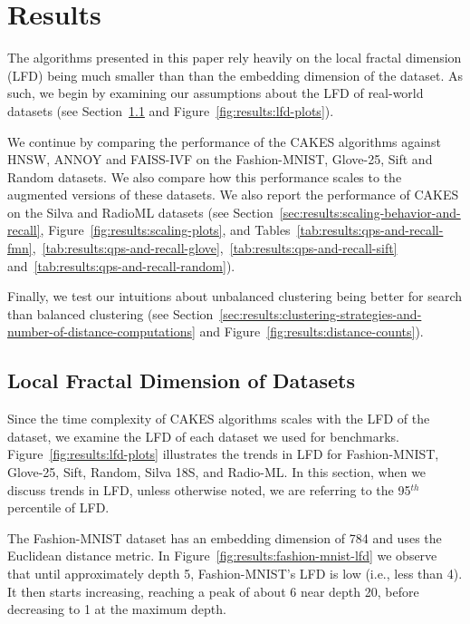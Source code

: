 \section{Results}
\label{sec:results}

The algorithms presented in this paper rely heavily on the local fractal dimension (LFD) being much smaller than than the embedding dimension of the dataset.
As such, we begin by examining our assumptions about the LFD of real-world datasets (see Section~\ref{sec:results:lfd-of-datasets} and Figure~\ref{fig:results:lfd-plots}).

We continue by comparing the performance of the CAKES algorithms against HNSW, ANNOY and FAISS-IVF on the Fashion-MNIST, Glove-25, Sift and Random datasets.
We also compare how this performance scales to the augmented versions of these datasets.
We also report the performance of CAKES on the Silva and RadioML datasets (see Section~\ref{sec:results:scaling-behavior-and-recall}, Figure~\ref{fig:results:scaling-plots}, and Tables~\ref{tab:results:qps-and-recall-fmn},~\ref{tab:results:qps-and-recall-glove},~\ref{tab:results:qps-and-recall-sift} and~\ref{tab:results:qps-and-recall-random}).

Finally, we test our intuitions about unbalanced clustering being better for search
than balanced clustering (see Section~\ref{sec:results:clustering-strategies-and-number-of-distance-computations} and Figure~\ref{fig:results:distance-counts}).


\subsection{Local Fractal Dimension of Datasets}
\label{sec:results:lfd-of-datasets}

Since the time complexity of CAKES algorithms scales with the LFD of the dataset, we examine the LFD of each dataset we used for benchmarks.
Figure~\ref{fig:results:lfd-plots} illustrates the trends in LFD for Fashion-MNIST, Glove-25, Sift, Random, Silva 18S, and Radio-ML.
In this section, when we discuss trends in LFD, unless otherwise noted, we are referring to the 95$^{th}$ percentile of LFD.

The Fashion-MNIST dataset has an embedding dimension of 784 and uses the Euclidean distance metric.
In Figure~\ref{fig:results:fashion-mnist-lfd} we observe that until approximately depth 5, Fashion-MNIST's LFD is low (i.e., less than 4).
It then starts increasing, reaching a peak of about 6 near depth 20, before decreasing to 1 at the maximum depth.

